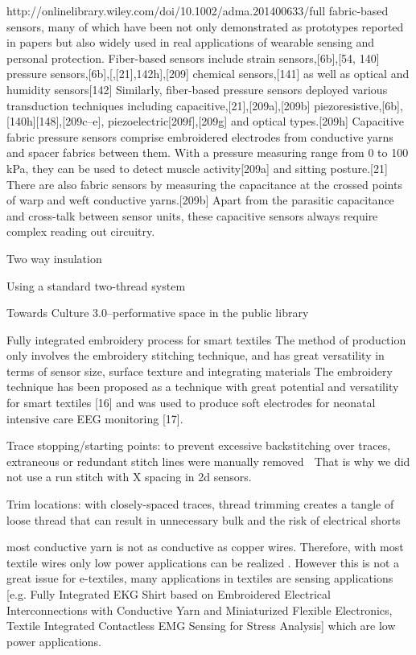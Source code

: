 http://onlinelibrary.wiley.com/doi/10.1002/adma.201400633/full
fabric-based sensors, many of which have been not only demonstrated as prototypes reported in papers but also widely used in real applications of wearable sensing and personal protection. Fiber-based sensors include strain sensors,[6b],[54, 140] pressure sensors,[6b],[,[21],142h],[209] chemical sensors,[141] as well as optical and humidity sensors[142]
Similarly, fiber-based pressure sensors deployed various transduction techniques including capacitive,[21],[209a],[209b] piezoresistive,[6b],[140h][148],[209c–e], piezoelectric[209f],[209g] and optical types.[209h] Capacitive fabric pressure sensors comprise embroidered electrodes from conductive yarns and spacer fabrics between them. With a pressure measuring range from 0 to 100 kPa, they can be used to detect muscle activity[209a] and sitting posture.[21] There are also fabric sensors by measuring the capacitance at the crossed points of warp and weft conductive yarns.[209b] Apart from the parasitic capacitance and cross-talk between sensor units, these capacitive sensors always require complex reading out circuitry. 

Two way insulation 

Using a standard two-thread system 

Towards Culture 3.0–performative space in the public library


Fully integrated embroidery process for smart textiles
The method of production only
involves the embroidery stitching technique, and has great
versatility in terms of sensor size, surface texture and
integrating materials
The embroidery technique has been proposed as a
technique with great potential and versatility for smart
textiles [16] and was used to produce soft electrodes for
neonatal intensive care EEG monitoring [17].


Trace stopping/starting points: to prevent excessive backstitching over traces, extraneous or redundant stitch lines were manually removed
 That is why we did not use a run stitch with X spacing in 2d sensors.


Trim locations: with closely-spaced traces, thread trimming creates a tangle of loose thread that can result in unnecessary bulk and the risk of electrical shorts

most conductive yarn is not as conductive as copper wires. Therefore, with most textile wires only low power applications can be realized \cite{linz2008embroidered}. However this is not a great issue for e-textiles, many applications in textiles are sensing applications [e.g. Fully Integrated EKG Shirt based on Embroidered Electrical
Interconnections with Conductive Yarn and Miniaturized Flexible Electronics, Textile Integrated
Contactless EMG Sensing for Stress Analysis] which are low power applications. 


